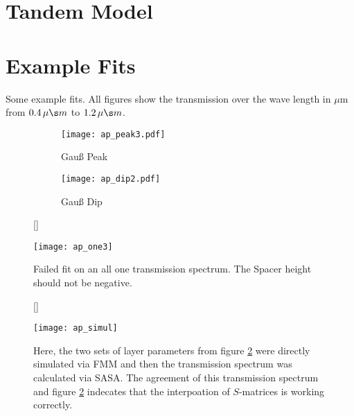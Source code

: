 \appendix
\section{Tandem Model}\label{sec:apdx_A}




\newpage

\section{Example Fits}\label{sec:apdx_B}
Some example fits. All figures show the transmission over the wave length in $\mu$m from $0.4\, \mu \s m$ to $1.2\, \mu \s m$.
\begin{figure}[H]
\centering
\begin{subfigure}{.5\textwidth}
    \centering
    \texttt{[image: ap\_peak3.pdf]}
    \caption{Gauß Peak}
    \label{gauspeak}
\end{subfigure}%
\begin{subfigure}{.5\textwidth}
    \centering
    \texttt{[image: ap\_dip2.pdf]}
    \caption{Gauß Dip}
    \label{gausdip}
\end{subfigure}
\caption{}
\label{}
\end{figure}

\begin{figure}[H]
    [\FBwidth]
    {\caption{
        Failed fit on an all one transmission spectrum. 
        The Spacer height should not be negative.
    }
    \label{one}}
    {\texttt{[image: ap\_one3]}}
\end{figure}

\begin{figure}[H]
    [\FBwidth]
    {\caption{
        Here, the two sets of layer parameters from figure \ref{gausdip} were directly simulated via FMM and then the transmission spectrum was calculated via SASA. The agreement of this transmission spectrum and figure \ref{gausdip} indecates that the interpoation of $S$-matrices is working correctly.
    }
    \label{fig:in:avg_plot}}
    {\texttt{[image: ap\_simul]}}
\end{figure}